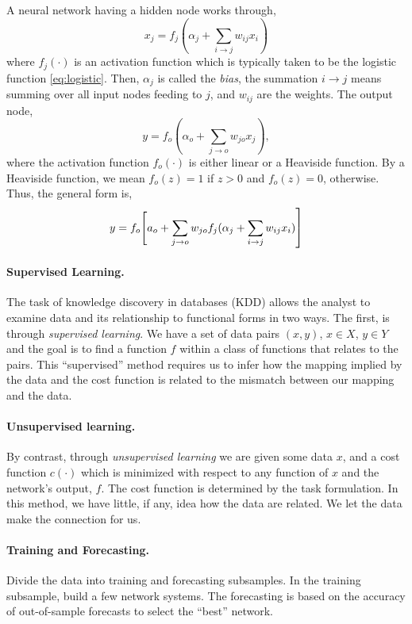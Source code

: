 A neural network having a hidden node works through,
\[
x_j = f_j(\alpha_j + \sum_{i \to j} w_{ij} x_i)
\]
where $f_j(\cdot)$ is an activation function which is typically taken to be 
the logistic function \eqref{eq:logistic}. Then, $\alpha_j$ is called the \emph{bias}, the summation $i \to j$ means summing over all input nodes feeding to $j$, and $w_{ij}$ are the weights.
The output node, 
\[
y=f_o(\alpha_o + \sum_{j \to o} w_{jo} x_j),
\]
where the activation function $f_o(\cdot)$ is either linear or a Heaviside 
function. By a Heaviside function, we mean $f_o(z) = 1$ if $z > 0$ and $f_o(z) = 0$, otherwise. Thus, the general form is,
\begin{equation}
y= f_o \Biggr[a_o + \sum_{j \to o} w_{jo} f_j \large( \alpha_j + \sum_{i \to j} w_{ij} x_i \large) \Biggr]
\end{equation}

\paragraph{Supervised Learning.} The task of knowledge discovery in databases (KDD) allows the analyst to examine data and its relationship to functional forms in two ways. The first, is through \emph{supervised learning}.  We have a set of data pairs $(x, y)$, $x \in X$, $y \in Y$ and the goal is to find a function $f$ within a class of functions that relates to the pairs. This ``supervised'' method requires us to infer how the mapping implied by the data and the cost function is related to the mismatch between our mapping and the data.

\paragraph{Unsupervised learning.} By contrast, through \emph{unsupervised learning} we are given some data $x$, and a cost function $c(\cdot)$ which is minimized with respect to any function of $x$ and the network's output, $f$. The cost function is determined by the task formulation. In this method, we have little, if any, idea how the data are related. We let the data make the connection for us.

\paragraph{Training and Forecasting.} Divide the data into training and forecasting subsamples. In the training subsample, build a few network systems. The forecasting is based on the accuracy of out-of-sample forecasts to select the ``best'' network. 

